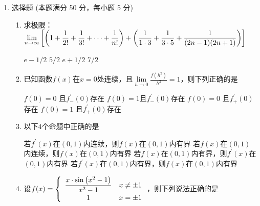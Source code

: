 
\begin{enumerate}
	\item
选择题 (本题满分 50 分，每小题 5 分)
\begin{enumerate}
	\item
求极限：$ \lim \limits_{n \rightarrow \infty}\left[\left(1+\dfrac{\mathstrut 1}{\mathstrut 2!}+\dfrac{1}{3 !}+\dots+\dfrac{1}{n!}\right)+\left(\dfrac{1}{1\cdot3}+\dfrac{1}{3 \cdot 5}+\dfrac{1}{(2 n-1)(2 n+1)}\right)\right] $ 


\fourchoices
{$ e-1/2 $}
{$ 5/2 $}
{$ e+1/2 $}
{$ 7/2 $}




\item 
已知函数$ f(x) $在$ x=0 $处连续，且$\lim\limits _{h \rightarrow 0} \frac{f\left(h^{2}\right)}{h^{2}}=1$，则下列正确的是  


\fourchoices
{$ f(0)=0 $ 且$ f_- ^{\prime} (0) $存在}
{$ f(0)=1 $且$ f_- ^{\prime} (0) $存在}
{$ f(0)=0 $ 且$ f_+ ^{\prime} (0) $存在}
{$ f(0)=1 $ 且$ f_+ ^{\prime} (0) $存在}


\item 
以下$ 4 $个命题中正确的是  


\fourchoices
{若$ f ^{\prime} (x) $在$ (0,1) $内连续，则$ f(x) $在$ (0,1) $内有界}
{若$ f(x) $在$ (0,1) $内连续，则$ f(x) $在$ (0,1) $内有界}
{若$ f(x) $在$ (0,1) $内有界，则$ f ^{\prime} (x) $在$ (0,1) $内有界}
{若$ f ^{\prime} (x) $在$ (0,1) $内有界，则$ f(x) $在$ (0,1) $内有界}



\item 
设$ f(x)=\left\{\begin{array}{cl}{\dfrac{\mathstrut x \cdot \sin \left(x^{2}-1\right)}{\mathstrut x^{2}-1}} & {x \neq \pm 1} \\ \mathstrut {1} & {x=\pm 1}\end{array}\right. $，则下列说法正确的是 



\end{enumerate}
\end{enumerate}

